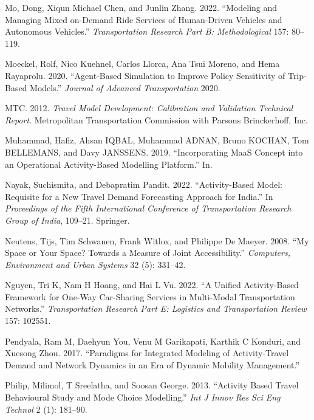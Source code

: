 \documentclass[12pt, oneside, openright]{byuthesis}
\newlength{\cslhangindent}
\newlength{\cslentryspacingunit} %
\newenvironment{CSLReferences}[2] %
 {%
  \setlength{\parindent}{0pt}
  \ifodd #1
  \let\oldpar\par
  \def\par{\hangindent=\cslhangindent\oldpar}
  \fi
  \setlength{\parskip}{#2\cslentryspacingunit}
 }%
 {}
\begin{document}
\begin{CSLReferences}{1}{0}
\leavevmode{}%
Mo, Dong, Xiqun Michael Chen, and Junlin Zhang. 2022. {``Modeling and Managing Mixed on-Demand Ride Services of Human-Driven Vehicles and Autonomous Vehicles.''} \emph{Transportation Research Part B: Methodological} 157: 80--119.

\leavevmode{}%
Moeckel, Rolf, Nico Kuehnel, Carlos Llorca, Ana Tsui Moreno, and Hema Rayaprolu. 2020. {``Agent-Based Simulation to Improve Policy Sensitivity of Trip-Based Models.''} \emph{Journal of Advanced Transportation} 2020.

\leavevmode{}%
MTC. 2012. \emph{Travel Model Development: Calibration and Validation Technical Report}. Metropolitan Transportation Commission with Parsons Brinckerhoff, Inc.

\leavevmode{}%
Muhammad, Hafiz, Ahsan IQBAL, Muhammad ADNAN, Bruno KOCHAN, Tom BELLEMANS, and Davy JANSSENS. 2019. {``Incorporating MaaS Concept into an Operational Activity-Based Modelling Platform.''} In.

\leavevmode{}%
Nayak, Suchismita, and Debapratim Pandit. 2022. {``Activity-Based Model: Requisite for a New Travel Demand Forecasting Approach for India.''} In \emph{Proceedings of the Fifth International Conference of Transportation Research Group of India}, 109--21. Springer.

\leavevmode{}%
Neutens, Tijs, Tim Schwanen, Frank Witlox, and Philippe De Maeyer. 2008. {``My Space or Your Space? Towards a Measure of Joint Accessibility.''} \emph{Computers, Environment and Urban Systems} 32 (5): 331--42.

\leavevmode{}%
Nguyen, Tri K, Nam H Hoang, and Hai L Vu. 2022. {``A Unified Activity-Based Framework for One-Way Car-Sharing Services in Multi-Modal Transportation Networks.''} \emph{Transportation Research Part E: Logistics and Transportation Review} 157: 102551.

\leavevmode{}%
Pendyala, Ram M, Daehyun You, Venu M Garikapati, Karthik C Konduri, and Xuesong Zhou. 2017. {``Paradigms for Integrated Modeling of Activity-Travel Demand and Network Dynamics in an Era of Dynamic Mobility Management.''}

\leavevmode{}%
Philip, Milimol, T Sreelatha, and Soosan George. 2013. {``Activity Based Travel Behavioural Study and Mode Choice Modelling.''} \emph{Int J Innov Res Sci Eng Technol} 2 (1): 181--90.


\end{CSLReferences}
\end{document}

